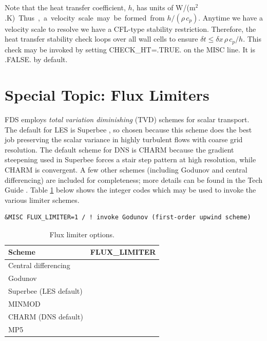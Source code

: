\documentclass[11pt]{book}
\begin{document}
Note that the heat transfer coefficient, $h$, has units of \si{W/(m$^2$.K)}.  Thus, a velocity scale may be formed from $h/(\rho\, c_p)$. Anytime we have a velocity scale to resolve we have a CFL-type stability restriction. Therefore, the heat transfer stability check loops over all wall cells to ensure $\delta t \le \delta x \,\rho \,c_p/h$. This check may be invoked by setting {\ct CHECK\_HT=.TRUE.} on the {\ct MISC} line. It is {\ct .FALSE.} by default.





\section{Special Topic: Flux Limiters}
\label{info:flux_limiters}

FDS employs \emph{total variation diminishing} (TVD) schemes for scalar transport.  The default for LES is Superbee \cite{Roe:1986}, so chosen because this scheme does the best job preserving the scalar variance in highly turbulent flows with coarse grid resolution.  The default scheme for DNS is CHARM \cite{Zhou:1995} because the gradient steepening used in Superbee forces a stair step pattern at high resolution, while CHARM is convergent.   A few other schemes (including Godunov and central differencing) are included for completeness; more details can be found in the Tech Guide \cite{FDS_Tech_Guide}.  Table \ref{tab:flux_limiters} below shows the integer codes which may be used to invoke the various limiter schemes.

\begin{lstlisting}
&MISC FLUX_LIMITER=1 / ! invoke Godunov (first-order upwind scheme)
\end{lstlisting}

\begin{table}[ht]
\caption[Flux limiter options]{Flux limiter options.}
\label{tab:flux_limiters}
\centering
\begin{tabular}{|lc|}
\hline
Scheme                 & {\ct FLUX\_LIMITER} \\
\hline
Central differencing   & {\ct 0}  \\
Godunov                & {\ct 1}  \\
Superbee (LES default) & {\ct 2}  \\
MINMOD                 & {\ct 3}  \\
CHARM (DNS default)    & {\ct 4}  \\
MP5                    & {\ct 5}  \\ \hline
\end{tabular}
\end{table}
\end{document}
